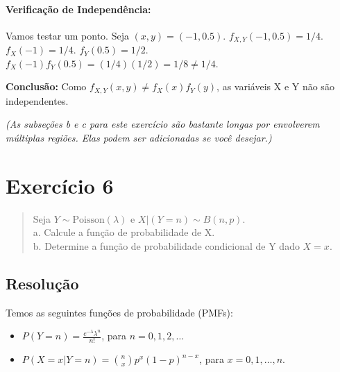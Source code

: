 \documentclass[12pt]{article}
\begin{document}
\paragraph{Verificação de Independência:}
Vamos testar um ponto. Seja $(x,y) = (-1, 0.5)$.
$f_{X,Y}(-1, 0.5) = 1/4$.
$f_X(-1) = 1/4$.
$f_Y(0.5) = 1/2$.
$f_X(-1)f_Y(0.5) = (1/4)(1/2) = 1/8 \neq 1/4$.

\textbf{Conclusão:} Como $f_{X,Y}(x,y) \neq f_X(x)f_Y(y)$, as variáveis X e Y não são independentes.

\textit{(As subseções b e c para este exercício são bastante longas por envolverem múltiplas regiões. Elas podem ser adicionadas se você desejar.)}

\section{Exercício 6}

\begin{quote}
Seja $Y \sim \text{Poisson}(\lambda)$ e $X|(Y=n) \sim B(n, p)$. \\
a. Calcule a função de probabilidade de X. \\
b. Determine a função de probabilidade condicional de Y dado $X=x$.
\end{quote}

\subsection*{Resolução}
Temos as seguintes funções de probabilidade (PMFs):
\begin{itemize}
    \item $P(Y=n) = \frac{e^{-\lambda}\lambda^n}{n!}$, para $n = 0, 1, 2, \dots$
    \item $P(X=x | Y=n) = \binom{n}{x} p^x (1-p)^{n-x}$, para $x = 0, 1, \dots, n$.
\end{itemize}
\end{document}
